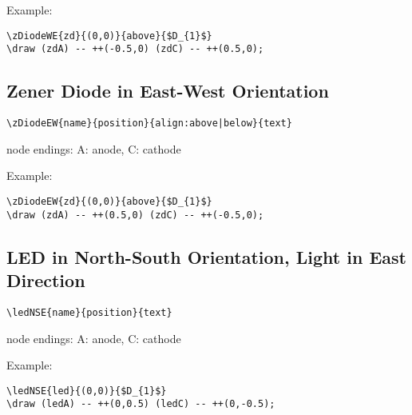 \documentclass[parskip=full]{scrartcl}
\begin{document}
Example:\\
\begin{minipage}{0.8\textwidth}
\begin{verbatim}
\zDiodeWE{zd}{(0,0)}{above}{$D_{1}$}
\draw (zdA) -- ++(-0.5,0) (zdC) -- ++(0.5,0);
\end{verbatim}
\end{minipage}
\begin{minipage}{0.19\textwidth}
\end{minipage}

\subsection{Zener Diode in East-West Orientation}

\begin{verbatim}
\zDiodeEW{name}{position}{align:above|below}{text}
\end{verbatim}
node endings: A: anode, C: cathode

Example:\\
\begin{minipage}{0.8\textwidth}
\begin{verbatim}
\zDiodeEW{zd}{(0,0)}{above}{$D_{1}$}
\draw (zdA) -- ++(0.5,0) (zdC) -- ++(-0.5,0);
\end{verbatim}
\end{minipage}
\begin{minipage}{0.19\textwidth}
\end{minipage}

\subsection{LED in North-South Orientation, Light in East Direction}

\begin{verbatim}
\ledNSE{name}{position}{text}
\end{verbatim}
node endings: A: anode, C: cathode

Example:\\
\begin{minipage}{0.8\textwidth}
\begin{verbatim}
\ledNSE{led}{(0,0)}{$D_{1}$}
\draw (ledA) -- ++(0,0.5) (ledC) -- ++(0,-0.5);
\end{verbatim}
\end{minipage}
\begin{minipage}{0.19\textwidth}
\end{minipage}
\end{document}
